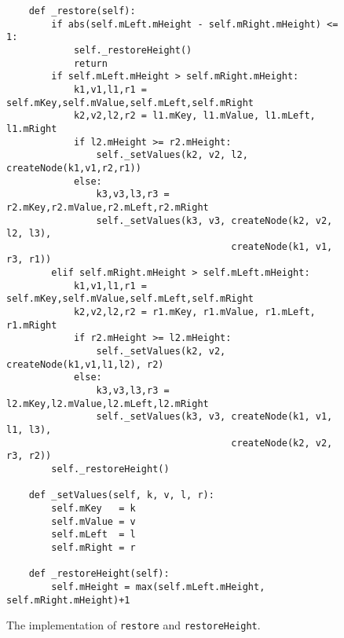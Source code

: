 \begin{figure}[!ht]
\centering
\begin{verbatim}
    def _restore(self):
        if abs(self.mLeft.mHeight - self.mRight.mHeight) <= 1:
            self._restoreHeight()
            return
        if self.mLeft.mHeight > self.mRight.mHeight:
            k1,v1,l1,r1 = self.mKey,self.mValue,self.mLeft,self.mRight
            k2,v2,l2,r2 = l1.mKey, l1.mValue, l1.mLeft, l1.mRight
            if l2.mHeight >= r2.mHeight:
                self._setValues(k2, v2, l2, createNode(k1,v1,r2,r1))
            else: 
                k3,v3,l3,r3 = r2.mKey,r2.mValue,r2.mLeft,r2.mRight
                self._setValues(k3, v3, createNode(k2, v2, l2, l3),
                                        createNode(k1, v1, r3, r1))
        elif self.mRight.mHeight > self.mLeft.mHeight:
            k1,v1,l1,r1 = self.mKey,self.mValue,self.mLeft,self.mRight
            k2,v2,l2,r2 = r1.mKey, r1.mValue, r1.mLeft, r1.mRight
            if r2.mHeight >= l2.mHeight:
                self._setValues(k2, v2, createNode(k1,v1,l1,l2), r2)
            else:
                k3,v3,l3,r3 = l2.mKey,l2.mValue,l2.mLeft,l2.mRight
                self._setValues(k3, v3, createNode(k1, v1, l1, l3),
                                        createNode(k2, v2, r3, r2))
        self._restoreHeight()
    
    def _setValues(self, k, v, l, r):
        self.mKey   = k
        self.mValue = v
        self.mLeft  = l
        self.mRight = r
    
    def _restoreHeight(self):
        self.mHeight = max(self.mLeft.mHeight, self.mRight.mHeight)+1
\end{verbatim}
\vspace*{-0.3cm}
\caption{The implementation of \texttt{restore} and \texttt{restoreHeight}.}
\label{fig:avl-tree.ipython:restore}
\end{figure}


